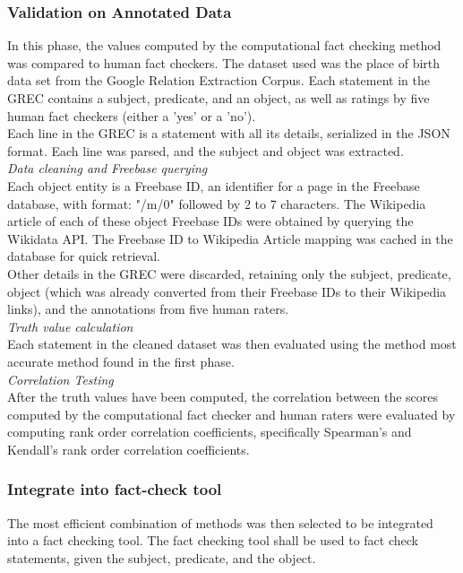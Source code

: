 \documentclass[10pt,11pt,12pt,oneside]{book}
\begin{document}
\subsubsection{Validation on Annotated Data}

In this phase, the values computed by the computational fact checking method was compared to human fact checkers. The dataset used was the place of birth data set from the Google Relation Extraction Corpus. Each statement in the GREC contains a subject, predicate, and an object, as well as ratings by five human fact checkers (either a 'yes' or a 'no').\\

Each line in the GREC is a statement with all its details, serialized in the JSON format. Each line was parsed, and the subject and object was extracted. \\

\textit{Data cleaning and Freebase querying}\\

Each object entity is a Freebase ID, an identifier for a page in the Freebase database, with format: "/m/0" followed by 2 to 7 characters. The Wikipedia article of each of these object Freebase IDs were obtained by querying the Wikidata API. The Freebase ID to Wikipedia Article mapping was cached in the database for quick retrieval.\\

Other details in the GREC were discarded, retaining only the subject, predicate, object (which was already converted from their Freebase IDs to their Wikipedia links), and the annotations from five human raters.\\

\textit{Truth value calculation}\\

Each statement in the cleaned dataset was then evaluated using the method most accurate method found in the first phase.\\

\textit{Correlation Testing}\\
After the truth values have been computed, the correlation between the scores computed by the computational fact checker and human raters were evaluated by computing rank order correlation coefficients, specifically Spearman's and Kendall's rank order correlation coefficients.

\subsubsection{Integrate into fact-check tool}
The most efficient combination of methods was then selected to be integrated into a fact checking tool. The fact checking tool shall be used to fact check statements, given the subject, predicate, and the object.
\end{document}

